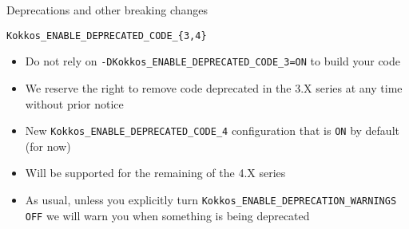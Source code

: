 
\begin{frame}[fragile]

        {\Huge Deprecations and other breaking changes}

  \vspace{-20pt}

\end{frame}


\begin{frame}[fragile]{\texttt{Kokkos\_ENABLE\_DEPRECATED\_CODE\_\{3,4\}}}

\begin{itemize}
\item Do not rely on \texttt{-DKokkos\_ENABLE\_DEPRECATED\_CODE\_3=ON} to build your code
\item We reserve the right to remove code deprecated in the 3.X series at any time without prior notice
\item New \texttt{Kokkos\_ENABLE\_DEPRECATED\_CODE\_4} configuration that is \texttt{ON} by default (for now)
\item Will be supported for the remaining of the 4.X series
\item As usual, unless you explicitly turn \texttt{Kokkos\_ENABLE\_DEPRECATION\_WARNINGS} \texttt{OFF} we will warn you when something is being deprecated
\end{itemize}

\end{frame}


